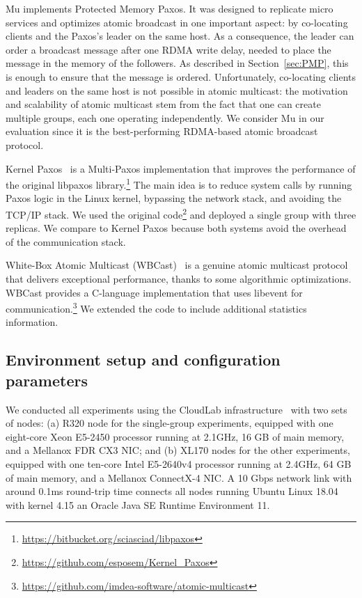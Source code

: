 Mu \cite{Aguilera2019} implements Protected Memory Paxos.
It was designed to replicate micro services and optimizes atomic broadcast in one important aspect: by co-locating clients and the Paxos's leader on the same host.
As a consequence, the leader can order a broadcast message after one RDMA write delay, needed to place the message in the memory of the followers.
As described in Section~\ref{sec:PMP}, this is enough to ensure that the message is ordered.
Unfortunately, co-locating clients and leaders on the same host is not possible in atomic multicast: the motivation and scalability of atomic multicast stem from the fact that one can create multiple groups, each one operating independently.
We consider Mu in our evaluation since it is the best-performing RDMA-based atomic broadcast protocol.

Kernel Paxos~\cite{esposito2018kernel} is a Multi-Paxos implementation that improves the performance of the original libpaxos library.\footnote{\url{https://bitbucket.org/sciasciad/libpaxos}}
The main idea is to reduce system calls by running Paxos logic in the Linux kernel, bypassing the network stack, and avoiding the TCP/IP stack. 
We used the original code\footnote{\url{https://github.com/esposem/Kernel_Paxos}} and deployed a single group with three replicas.
We compare \libname to Kernel Paxos because both systems avoid the overhead of the communication stack.

White-Box Atomic Multicast (WBCast)~\cite{gotsman2019white} is a genuine atomic multicast protocol that delivers exceptional performance, thanks to some algorithmic optimizations.
 WBCast provides a C-language implementation that uses libevent for communication.\footnote{\url{https://github.com/imdea-software/atomic-multicast}}
 We extended the code to include additional statistics information.


\subsection{Environment setup and configuration parameters}
\label{sec:evaluation:setup}

We conducted all experiments using the CloudLab infrastructure~\cite{DuplyakinATC19cloudlab} with two sets of nodes: 
(a) R320 node for the single-group experiments, equipped with one eight-core Xeon E5-2450 processor running at 2.1GHz, 16 GB of main memory, and a Mellanox FDR CX3 NIC; and (b) XL170 nodes for the other experiments, equipped with one ten-core Intel E5-2640v4 processor running at 2.4GHz, 64 GB of main memory, and a Mellanox ConnectX-4 NIC. 
A 10 Gbps network link with around 0.1ms round-trip time connects all nodes running Ubuntu Linux 18.04 with kernel 4.15 an Oracle Java SE Runtime Environment 11. 


